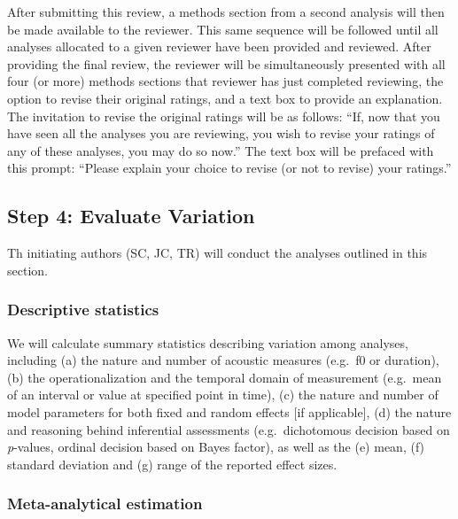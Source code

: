 \documentclass[
  12pt,
]{article}
\begin{document}
After submitting this review, a methods section from a second analysis will then be made available to the reviewer.
This same sequence will be followed until all analyses allocated to a given reviewer have been provided and reviewed.
After providing the final review, the reviewer will be simultaneously presented with all four (or more) methods sections that reviewer has just completed reviewing, the option to revise their original ratings, and a text box to provide an explanation.
The invitation to revise the original ratings will be as follows: ``If, now that you have seen all the analyses you are reviewing, you wish to revise your ratings of any of these analyses, you may do so now.''
The text box will be prefaced with this prompt: ``Please explain your choice to revise (or not to revise) your ratings.''

\hypertarget{step-4-evaluate-variation}{%
\subsection{Step 4: Evaluate Variation}\label{step-4-evaluate-variation}}

Th initiating authors (SC, JC, TR) will conduct the analyses outlined in this section.

\hypertarget{descriptive-statistics}{%
\subsubsection{Descriptive statistics}\label{descriptive-statistics}}

We will calculate summary statistics describing variation among analyses, including (a) the nature and number of acoustic measures (e.g.~f0 or duration), (b) the operationalization and the temporal domain of measurement (e.g.~mean of an interval or value at specified point in time), (c) the nature and number of model parameters for both fixed and random effects {[}if applicable{]}, (d) the nature and reasoning behind inferential assessments (e.g.~dichotomous decision based on \emph{p}-values, ordinal decision based on Bayes factor), as well as the (e) mean, (f) standard deviation and (g) range of the reported effect sizes.

\hypertarget{s:meta-est}{%
\subsubsection{Meta-analytical estimation}\label{s:meta-est}}
\end{document}
